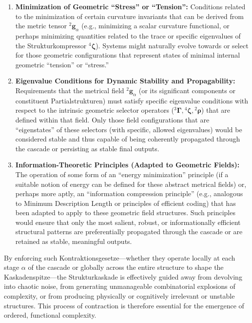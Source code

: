 \documentclass[
    12pt,              %
    a4paper,           %
    headings=normal,   %
    twoside=true,      %
    BCOR=8mm,          %
]{scrbook}
\newcommand{\q}[1]{\enquote{#1}}
\newcommand{\kompositionsfeld}{{}^2\mathbf{g}}
\newcommand{\fundamentalkondensor}{{}^3\bm{\Gamma}}
\newcommand{\kaskadenstufe}{\alpha}
\newcommand{\strukturkompressor}{{}^4\bm{\zeta}}
\begin{document}
\begin{itemize}
        \begin{enumerate}[label=(\alph*)]
            \item  \textbf{Minimization of Geometric \q{Stress} or \q{Tension}:} Conditions related to the minimization of certain curvature invariants that can be derived from the metric tensor \(\kompositionsfeld_\alpha\) (e.g., minimizing a scalar curvature functional, or perhaps minimizing quantities related to the trace or specific eigenvalues of the Strukturkompressor \(\strukturkompressor\)). Systems might naturally evolve towards or select for those geometric configurations that represent states of minimal internal geometric \q{tension} or \q{stress.}
            \item  \textbf{Eigenvalue Conditions for Dynamic Stability and Propagability:} Requirements that the metrical field \(\kompositionsfeld_\alpha\) (or its significant components or constituent Partialstrukturen) must satisfy specific eigenvalue conditions with respect to the intrinsic geometric selector operators (\(\fundamentalkondensor, \strukturkompressor, {}^2\bm{\rho}\)) that are defined within that field. Only those field configurations that are \q{eigenstates} of these selectors (with specific, allowed eigenvalues) would be considered stable and thus capable of being coherently propagated through the cascade or persisting as stable final outputs.
            \item  \textbf{Information-Theoretic Principles (Adapted to Geometric Fields):} The operation of some form of an \q{energy minimization} principle (if a suitable notion of energy can be defined for these abstract metrical fields) or, perhaps more aptly, an \q{information compression principle} (e.g., analogous to Minimum Description Length or principles of efficient coding) that has been adapted to apply to these geometric field structures. Such principles would ensure that only the most salient, robust, or informationally efficient structural patterns are preferentially propagated through the cascade or are retained as stable, meaningful outputs.
        \end{enumerate}
\end{itemize}
By enforcing such Kontraktionsgesetze—whether they operate locally at each stage \(\kaskadenstufe\) of the cascade or globally across the entire structure to shape the Kaskadenspitze—the Strukturkaskade is effectively guided away from devolving into chaotic noise, from generating unmanageable combinatorial explosions of complexity, or from producing physically or cognitively irrelevant or unstable structures. This process of contraction is therefore essential for the emergence of ordered, functional complexity.
\end{document}
